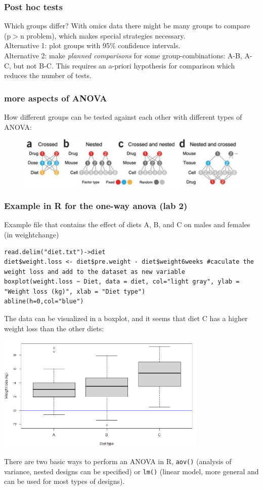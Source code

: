 \documentclass{article}
\begin{document}
\subsubsection{Post hoc tests}
Which groups differ? With omics data there might be many groups to compare (p$>$n problem), which makes special strategies necessary.\\
Alternative 1: plot groups with 95\% confidence intervals.\\
Alternative 2: make \textit{planned comparisons} for some group-combinations: A-B, A-C, but not B-C. This requires an a-priori hypothesis for comparison which reduces the number of tests.

\subsubsection{more aspects of ANOVA}
How different groups can be tested against each other with different types of ANOVA:
\begin{figure}[h]
    \centering
    \includegraphics[width = 1\textwidth]{ANOVA/anovakinds.jpg}
\end{figure}

\subsubsection{Example in R for the one-way anova (lab 2)}
Example file that contains the effect of diets A, B, and C on males and females (in weightchange)
\begin{lstlisting}
read.delim("diet.txt")->diet
diet$weight.loss <- diet$pre.weight - diet$weight6weeks #caculate the weight loss and add to the dataset as new variable
boxplot(weight.loss ~ Diet, data = diet, col="light gray", ylab = "Weight loss (kg)", xlab = "Diet type")
abline(h=0,col="blue")
\end{lstlisting}
The data can be visualized in a boxplot, and it seems that diet C has a higher weight loss than the other diets:
\begin{center}
    \includegraphics[width = 0.75\textwidth]{lab2/lab2_boxplot.png}
\end{center}
There are two basic ways to perform an ANOVA in R, \texttt{aov()} (analysis of variance, nested designs can be specified) or \texttt{lm()} (linear model, more general and can be used for most types of designs).
\end{document}
